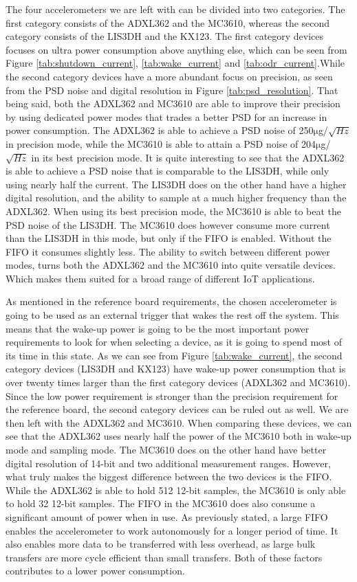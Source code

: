 The four accelerometers we are left with can be divided into two categories. The first category consists of the ADXL362 and the MC3610, whereas the second category consists of the LIS3DH and the KX123. The first category devices focuses on ultra power consumption above anything else, which can be seen from Figure \ref{tab:shutdown_current}, \ref{tab:wake_current} and \ref{tab:odr_current}.While the second category devices have a more abundant focus on precision, as seen from the PSD noise and digital resolution in Figure \ref{tab:psd_resolution}. That being said, both the ADXL362 and MC3610 are able to improve their precision by using dedicated power modes that trades a better PSD for an increase in power consumption. The ADXL362 is able to achieve a PSD noise of 250$\si{\micro}$g/$\sqrt{Hz}$ in precision mode, while the MC3610 is able to attain a PSD noise of 204$\si{\micro}$g/$\sqrt{Hz}$ in its best precision mode. It is quite interesting to see that the ADXL362 is able to achieve a PSD noise that is comparable to the LIS3DH, while only using nearly half the current. The LIS3DH does on the other hand have a higher digital resolution, and the ability to sample at a much higher frequency than the ADXL362. When using its best precision mode, the MC3610 is able to beat the PSD noise of the LIS3DH. The MC3610 does however consume more current than the LIS3DH in this mode, but only if the FIFO is enabled. Without the FIFO it consumes slightly less. The ability to switch between different power modes, turns both the ADXL362 and the MC3610 into quite versatile devices. Which makes them suited for a broad range of different IoT applications.

As mentioned in the reference board requirements, the chosen accelerometer is going to be used as an external trigger that wakes the rest off the system. This means that the wake-up power is going to be the most important power requirements to look for when selecting a device, as it is going to spend most of its time in this state. As we can see from Figure \ref{tab:wake_current}, the second category devices (LIS3DH and KX123) have wake-up power consumption that is over twenty times larger than the first category devices (ADXL362 and MC3610). Since the low power requirement is stronger than the precision requirement for the reference board, the second category devices can be ruled out as well. We are then left with the ADXL362 and MC3610. When comparing these devices, we can see that the ADXL362 uses nearly half the power of the MC3610 both in wake-up mode and sampling mode. The MC3610 does on the other hand have better digital resolution of 14-bit and two additional measurement ranges. However, what truly makes the biggest difference between the two devices is the FIFO. While the ADXL362 is able to hold 512 12-bit samples, the MC3610 is only able to hold 32 12-bit samples. The FIFO in the MC3610 does also consume a significant amount of power when in use. As previously stated, a large FIFO enables the accelerometer to work autonomously for a longer period of time. It also enables more data to be transferred with less overhead, as large bulk transfers are more cycle efficient than small transfers. Both of these factors contributes to a lower power consumption. 

